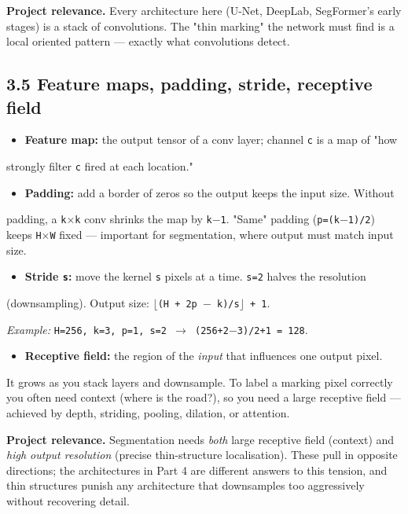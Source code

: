 \documentclass[11pt]{article}
\begin{document}
\textbf{Project relevance.} Every architecture here (U-Net, DeepLab, SegFormer's early stages) is a stack of convolutions. The "thin marking" the network must find is a local oriented pattern --- exactly what convolutions detect.

\subsection*{3.5 Feature maps, padding, stride, receptive field}

\begin{itemize}\setlength{\itemsep}{1pt}
\item \textbf{Feature map:} the output tensor of a conv layer; channel \texttt{c} is a map of "how
\end{itemize}
  strongly filter \texttt{c} fired at each location."

\begin{itemize}\setlength{\itemsep}{1pt}
\item \textbf{Padding:} add a border of zeros so the output keeps the input size. Without
\end{itemize}
  padding, a \texttt{k$\times$k} conv shrinks the map by \texttt{k$-$1}. "Same" padding (\texttt{p=(k$-$1)/2}) keeps   \texttt{H$\times$W} fixed --- important for segmentation, where output must match input size.

\begin{itemize}\setlength{\itemsep}{1pt}
\item \textbf{Stride \texttt{s}:} move the kernel \texttt{s} pixels at a time. \texttt{s=2} halves the resolution
\end{itemize}
  (downsampling). Output size: \texttt{$\lfloor$(H + 2p $-$ k)/s$\rfloor$ + 1}.

  \textit{Example:} \texttt{H=256, k=3, p=1, s=2 $\rightarrow$ (256+2$-$3)/2+1 = 128}.

\begin{itemize}\setlength{\itemsep}{1pt}
\item \textbf{Receptive field:} the region of the \textit{input} that influences one output pixel.
\end{itemize}
  It grows as you stack layers and downsample. To label a marking pixel correctly you   often need context (where is the road?), so you need a large receptive field ---   achieved by depth, striding, pooling, dilation, or attention.

\textbf{Project relevance.} Segmentation needs \textit{both} large receptive field (context) and \textit{high output resolution} (precise thin-structure localisation). These pull in opposite directions; the architectures in Part 4 are different answers to this tension, and thin structures punish any architecture that downsamples too aggressively without recovering detail.
\end{document}
